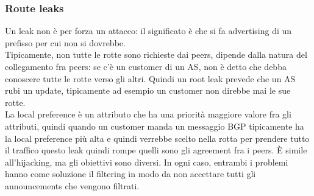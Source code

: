 \documentclass[12pt, oneside]{extbook} %
\begin{document}
\subsubsection{Route leaks}
Un leak non è per forza un attacco: il significato è che si fa advertising di un prefisso per cui non si dovrebbe.\\Tipicamente, non tutte le rotte sono richieste dai peers, dipende dalla natura del collegamento fra peers: se c'è un customer di un AS, non è detto che debba conoscere tutte le rotte verso gli altri. Quindi un root leak prevede che un AS rubi un update, tipicamente ad esempio un customer non direbbe mai le sue rotte.\\La local preference è un attributo che ha una priorità maggiore valore fra gli attributi, quindi quando un customer manda un messaggio BGP tipicamente ha la local preference più alta e quindi verrebbe scelto nella rotta per prendere tutto il traffico
questo leak quindi rompe quelli sono gli agreement fra i peers. È simile all'hijacking, ma gli obiettivi sono diversi. In ogni caso, entrambi i problemi hanno come soluzione il filtering in modo da non accettare tutti gli announcements che vengono filtrati.
\end{document}
